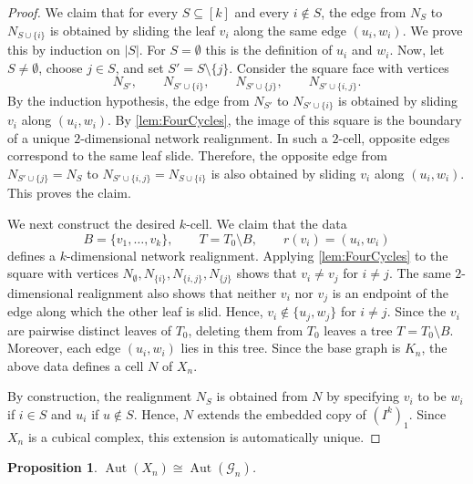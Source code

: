 \documentclass[reqno,dvipsnames]{amsart}
\theoremstyle{plain}
\newtheorem{proposition}[theorem]{Proposition}
\numberwithin{equation}{section}
\theoremstyle{definition}
\DeclareMathOperator{\Aut}{Aut}
\begin{document}
\begin{proof}
			We claim that for every $S\subseteq[k]$ and every $i\notin S$, the edge from $N_S$ to $N_{S\cup\{i\}}$ is obtained by sliding the leaf $v_i$ along the same edge $(u_i,w_i)$. We prove this by induction on $|S|$. For $S=\emptyset$ this is the definition of $u_i$ and $w_i$. Now, let $S\neq\emptyset$, choose $j\in S$, and set $S'=S\setminus\{j\}$. Consider the square face with vertices
			\[
			N_{S'},\qquad N_{S'\cup\{i\}},\qquad N_{S'\cup\{j\}},\qquad N_{S'\cup\{i,j\}}.
			\]
			By the induction hypothesis, the edge from $N_{S'}$ to $N_{S'\cup\{i\}}$ is obtained by sliding $v_i$ along $(u_i,w_i)$. By \autoref{lem:FourCycles}, the image of this square is the boundary of a unique $2$-dimensional network realignment. In such a $2$-cell, opposite edges correspond to the same leaf slide. Therefore, the opposite edge from $N_{S'\cup\{j\}}=N_S$ to $N_{S'\cup\{i,j\}}=N_{S\cup\{i\}}$ is also obtained by sliding $v_i$ along $(u_i,w_i)$. This proves the claim.

			We next construct the desired $k$-cell. We claim that the data
			\[
			B=\{v_1,\ldots,v_k\},\qquad T=T_0\setminus B,\qquad r(v_i)=(u_i,w_i)
			\]
			defines a $k$-dimensional network realignment. Applying \autoref{lem:FourCycles} to the square with vertices $N_\emptyset, N_{\{i\}},N_{\{i,j\}},N_{\{j\}}$ shows that $v_i\neq v_j$ for $i\neq j$. The same $2$-dimensional realignment also shows that neither $v_i$ nor $v_j$ is an endpoint of the edge along which the other leaf is slid. Hence, $v_i\notin \{u_j,w_j\}$ for $i\neq j$. Since the $v_i$ are pairwise distinct leaves of $T_0$, deleting them from $T_0$ leaves a tree $T=T_0\setminus B$. Moreover, each edge $(u_i,w_i)$ lies in this tree. Since the base graph is $K_n$, the above data defines a cell $N$ of $X_n$.

			By construction, the realignment $N_S$ is obtained from $N$ by specifying $v_i$ to be $w_i$ if $i\in S$ and $u_i$ if $u\notin S$. Hence, $N$ extends the embedded copy of $(I^k)_1$. Since $X_n$ is a cubical complex, this extension is automatically unique.
		\end{proof}

		\begin{proposition} \label{prop:AutomorphismReduction}
			$\Aut(X_n) \cong \Aut(\mathcal{G}_n)$.
		\end{proposition}
\end{document}
